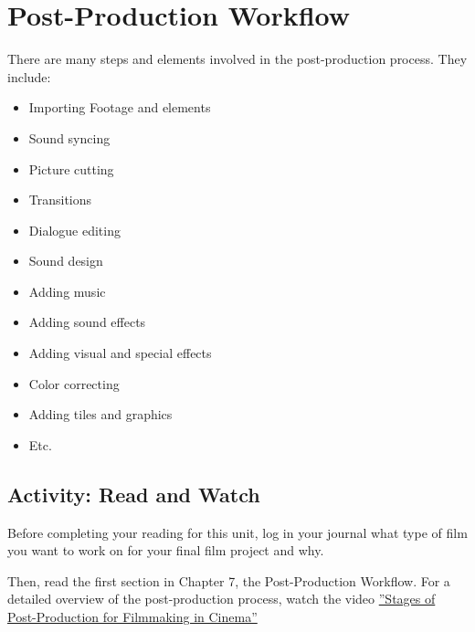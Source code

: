 \documentclass[
]{book}
\providecommand{\tightlist}{%
  \setlength{\itemsep}{0pt}\setlength{\parskip}{0pt}}
\begin{document}
\hypertarget{post-production-workflow}{%
\section{Post-Production Workflow}\label{post-production-workflow}}

There are many steps and elements involved in the post-production process. They include:

\begin{itemize}
\tightlist
\item
  Importing Footage and elements\\
\item
  Sound syncing\\
\item
  Picture cutting\\
\item
  Transitions\\
\item
  Dialogue editing\\
\item
  Sound design\\
\item
  Adding music\\
\item
  Adding sound effects\\
\item
  Adding visual and special effects\\
\item
  Color correcting\\
\item
  Adding tiles and graphics\\
\item
  Etc.
\end{itemize}

\hypertarget{activity-read-and-watch}{%
\subsection*{Activity: Read and Watch}\label{activity-read-and-watch}}

\begin{reflect}
Before completing your reading for this unit, log in your journal what type of film you want to work on for your final film project and why.

Then, read the first section in Chapter 7, the Post-Production Workflow. For a detailed overview of the post-production process, watch the video \href{https://www.youtube.com/watch?v=IFjyVW21Vpw}{''Stages of Post-Production for Filmmaking in Cinema''}
\end{reflect}
\end{document}
